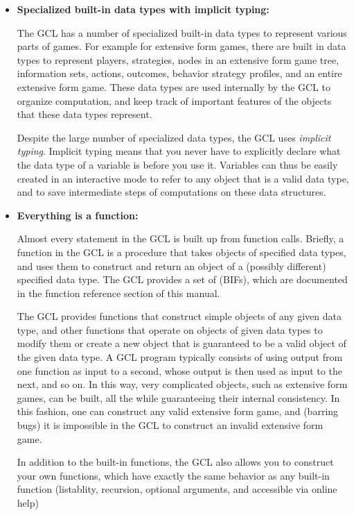 \begin{itemize}
\item {\bf Specialized built-in data types with implicit typing: }

The GCL has a number of specialized built-in data types to represent
various parts of games. For example for extensive form games, there
are built in data types to represent players, strategies, nodes in an
extensive form game tree, information sets, actions, outcomes,
behavior strategy profiles, and an entire extensive form game.
These data types are used internally by the GCL to organize
computation, and keep track of important features of the objects that
these data types represent.

Despite the large number of specialized data types, the GCL uses {\it
implicit typing}.  Implicit typing means that you never have to
explicitly declare what the data type of a variable is before you use
it.  Variables can thus be easily created in an interactive mode to
refer to any object that is a valid data type, and to save
intermediate steps of computations on these data structures.

\item {\bf Everything is a function: }

Almost every statement in the GCL is built up from function calls.
Briefly, a function in the GCL is a procedure that takes objects of
specified data types, and uses them to construct and return an object
of a (possibly different) specified data type.  The GCL provides a set
of  (BIFs), which are documented in the
function reference section of this manual.  

The GCL provides functions that construct simple objects of any given
data type, and other functions that operate on objects of given data
types to modify them or create a new object that is guaranteed to be a
valid object of the given data type.  A GCL program typically consists
of using output from one function as input to a second, whose output
is then used as input to the next, and so on.  In this way, very
complicated objects, such as extensive form games, can be built, all
the while guaranteeing their internal consistency.  In this fashion,
one can construct any valid extensive form game, and (barring bugs) it
is impossible in the GCL to construct an invalid extensive form game.

In addition to the built-in functions, the GCL also allows you to
construct your own functions, which have exactly the same behavior as
any built-in function (listablity, recursion, optional arguments,
and accessible via online help)


\end{itemize}
